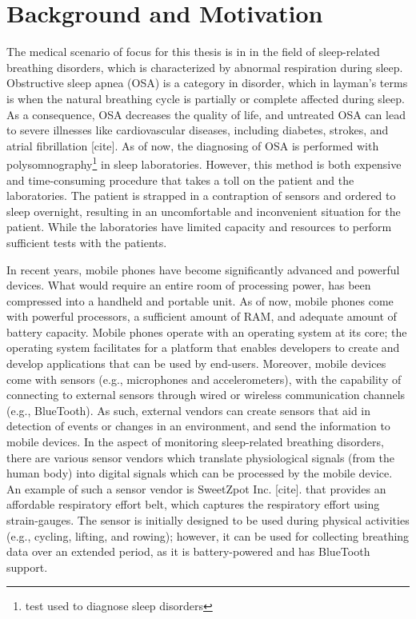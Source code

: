 \section{Background and Motivation}

The medical scenario of focus for this thesis is in in the field of sleep-related breathing disorders, which is characterized by abnormal respiration during sleep. Obstructive sleep apnea (OSA) is a category in disorder, which in layman's terms is when the natural breathing cycle is partially or complete affected during sleep. As a consequence, OSA decreases the quality of life, and untreated OSA can lead to severe illnesses like cardiovascular diseases, including diabetes, strokes, and atrial fibrillation [cite]. As of now, the diagnosing of OSA is performed with polysomnography\footnote{test used to diagnose sleep disorders} in sleep laboratories. However, this method is both expensive and time-consuming procedure that takes a toll on the patient and the laboratories. The patient is strapped in a contraption of sensors and ordered to sleep overnight, resulting in an uncomfortable and inconvenient situation for the patient. While the laboratories have limited capacity and resources to perform sufficient tests with the patients.

In recent years, mobile phones have become significantly advanced and powerful devices. What would require an entire room of processing power, has been compressed into a handheld and portable unit. As of now, mobile phones come with powerful processors, a sufficient amount of RAM, and adequate amount of battery capacity. Mobile phones operate with an operating system at its core; the operating system facilitates for a platform that enables developers to create and develop applications that can be used by end-users. Moreover, mobile devices come with sensors (e.g., microphones and accelerometers), with the capability of connecting to external sensors through wired or wireless communication channels (e.g., BlueTooth). As such, external vendors can create sensors that aid in detection of events or changes in an environment, and send the information to mobile devices. In the aspect of monitoring sleep-related breathing disorders, there are various sensor vendors which translate physiological signals (from the human body) into digital signals which can be processed by the mobile device. An example of such a sensor vendor is SweetZpot Inc. [cite]. that provides an affordable respiratory effort belt, which captures the respiratory effort using strain-gauges. The sensor is initially designed to be used during physical activities (e.g., cycling, lifting, and rowing); however, it can be used for collecting breathing data over an extended period, as it is battery-powered and has BlueTooth support. 

